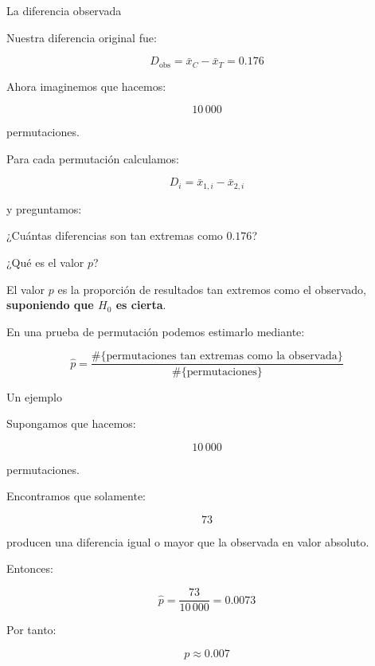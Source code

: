 \documentclass[11pt, aspectratio=169]{beamer}
\begin{document}
\begin{frame}{La diferencia observada}

Nuestra diferencia original fue:

\[
D_{\mathrm{obs}}
=
\bar{x}_{C}-\bar{x}_{T}
=
0.176
\]

Ahora imaginemos que hacemos:

\[
10\,000
\]

permutaciones.

\vspace{0.4cm}

Para cada permutación calculamos:

\[
D_i
=
\bar{x}_{1,i}-\bar{x}_{2,i}
\]

y preguntamos:

\begin{center}
\Large
¿Cuántas diferencias son tan extremas como $0.176$?
\end{center}

\end{frame}

\begin{frame}{¿Qué es el valor $p$?}

El valor $p$ es la proporción de resultados tan extremos
como el observado, \textbf{suponiendo que $H_0$ es cierta}.

\vspace{0.5cm}

En una prueba de permutación podemos estimarlo mediante:

\[
\boxed{
\hat p =
\frac{\#\{\text{permutaciones tan extremas como la observada}\}}
{\#\{\text{permutaciones}\}}
}
\]

\end{frame}

\begin{frame}{Un ejemplo}

Supongamos que hacemos:

\[
10\,000
\]

permutaciones.

Encontramos que solamente: \vspace{-1em}

\[
73
\]

producen una diferencia igual o mayor que la observada
en valor absoluto.

Entonces:

\[
\hat p =
\frac{73}{10\,000}
=
0.0073
\]

Por tanto:

\[
\boxed{p \approx 0.007}
\]

\end{frame}
\end{document}
